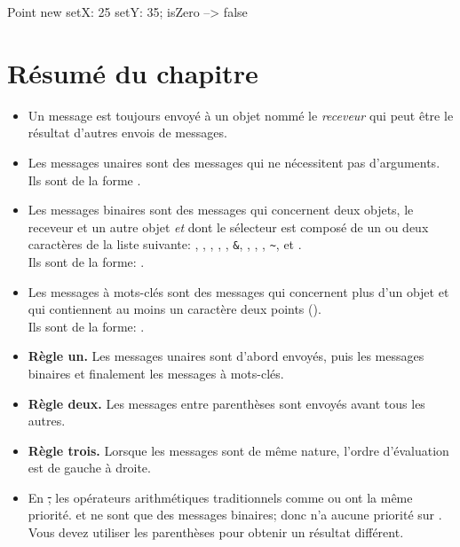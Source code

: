 \documentclass[a4paper,10pt,twoside]{book}
\begin{document}
\begin{code}{}
Point new setX: 25 setY: 35; isZero --> false
\end{code}
\section{Résumé du chapitre}

\begin{itemize}
\item Un message est toujours envoyé à un objet nommé le \emph{receveur} qui peut être le résultat d'autres envois de messages.

\item Les messages unaires sont des messages qui ne nécessitent pas d'arguments. Ils sont de la forme .

\item Les messages binaires sont des messages qui concernent deux objets, le receveur et un autre objet \emph{et} dont le sélecteur est composé de un ou deux caractères de la liste suivante: \ct{+}, \ct{-}, \ct{*}, \ct{/}, \ct{|}, \texttt{\&}, \ct{=}, \ct{>}, \ct{<}, \texttt{\~}, et .\\
Ils sont de la forme: .

\item Les messages à mots-clés sont des messages qui concernent plus d'un objet et qui contiennent au moins un caractère deux points (\ct{:}).\\
Ils sont de la forme: 
.

\item \textbf{Règle un.} Les messages unaires sont d'abord envoyés, puis les messages binaires et finalement les messages à mots-clés.

\item \textbf{Règle deux.} Les messages entre parenthèses sont envoyés avant tous les autres.

\item \textbf{Règle trois.} Lorsque les messages sont de même nature, l'ordre d'évaluation est de gauche à droite.

\item En \st, les opérateurs arithmétiques traditionnels comme \ct{+}
  ou \ct{*} ont la même priorité. \ct{+} et \ct{*} ne sont que des
  messages binaires; donc \ct{*} n'a aucune priorité sur
  \ct{+}. Vous devez utiliser les parenthèses pour obtenir un
  résultat différent.
\end{itemize}

\ifx\wholebook\relax\else
\end{document}
